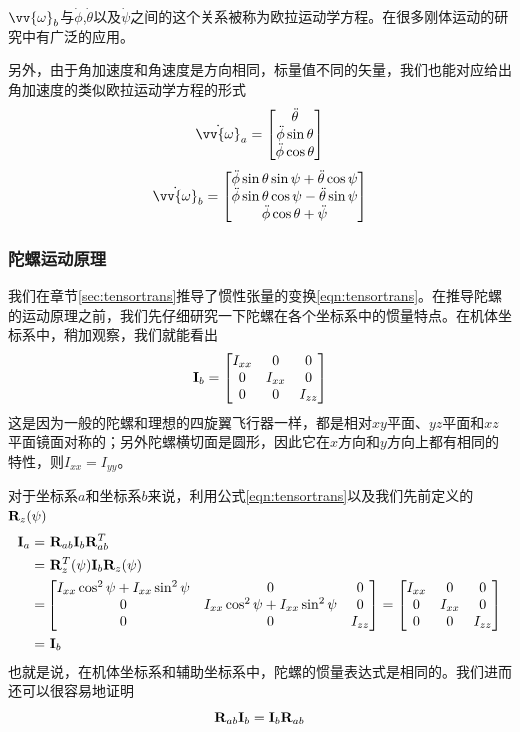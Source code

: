 \documentclass[11pt]{article}
\begin{document}
$\vv{\omega}_b$与$\dot{\phi}$,$\dot{\theta}$以及$\dot{\psi}$之间的这个关系被称为欧拉运动学方程。在很多刚体运动的研究中有广泛的应用。

另外，由于角加速度和角速度是方向相同，标量值不同的矢量，我们也能对应给出角加速度的类似欧拉运动学方程的形式
$$
\dot{\vv{\omega}}_a = \begin{bmatrix}\ddot{\theta}	\\ \ddot{\phi}\sin\theta	\\ \ddot{\phi}\cos\theta	\end{bmatrix}
$$
$$
\dot{\vv{\omega}}_b = \begin{bmatrix}
 \ddot{\phi}\sin\theta\sin\psi + \ddot{\theta}\cos\psi	\\
 \ddot{\phi}\sin\theta\cos\psi - \ddot{\theta}\sin\psi	\\
                    \ddot{\phi}\cos\theta + \ddot{\psi}	\\
\end{bmatrix}
$$

\subsubsection{陀螺运动原理}
我们在章节\ref{sec:tensortrans}推导了惯性张量的变换\ref{eqn:tensortrans}。在推导陀螺的运动原理之前，我们先仔细研究一下陀螺在各个坐标系中的惯量特点。在机体坐标系中，稍加观察，我们就能看出
$$
{\bf I}_b = 
\begin{bmatrix}
I_{xx}	&	0		&	0	\\
0		&	I_{xx}	&	0	\\
0		&	0		&	I_{zz}
\end{bmatrix}
$$
这是因为一般的陀螺和理想的四旋翼飞行器一样，都是相对$xy$平面、$yz$平面和$xz$平面镜面对称的；另外陀螺横切面是圆形，因此它在$x$方向和$y$方向上都有相同的特性，则$I_{xx} = I_{yy}$。

对于坐标系$a$和坐标系$b$来说，利用公式\ref{eqn:tensortrans}以及我们先前定义的${\bf R}_z(\psi)$
\begin{align*}
{\bf I}_a = & \ {\bf R}_{ab}{\bf I}_b{\bf R}^T_{ab} \\
          = & \ {\bf R}_z^T(\psi){\bf I}_b{\bf R}_z(\psi) \\
  	  = & 
\begin{bmatrix}
I_{xx}\cos^2\psi + I_{xx}\sin^2\psi	&	0		&	0	\\
0		&	I_{xx}\cos^2\psi + I_{xx}\sin^2\psi	&	0	\\
0		&	0		&	I_{zz}
\end{bmatrix}= 
\begin{bmatrix}
I_{xx}	&	0		&	0	\\
0		&	I_{xx}	&	0	\\
0		&	0		&	I_{zz}
\end{bmatrix}
	\\
	 = & \ {\bf I}_b
\end{align*}
也就是说，在机体坐标系和辅助坐标系中，陀螺的惯量表达式是相同的。我们进而还可以很容易地证明
$$
{\bf R}_{ab} {\bf I}_b = {\bf I}_b {\bf R}_{ab}
$$
\end{document}
